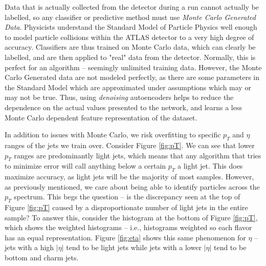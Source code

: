 Data that is actually collected from the detector during a run cannot actually be labelled, so any classifier or predictive method must use \emph{Monte Carlo Generated Data}. Physicists understand the Standard Model of Particle Physics well enough to model particle collisions within the ATLAS detector to a very high degree of accuracy. Classifiers are thus trained on Monte Carlo data, which can clearly be labelled, and are then applied to "real" data from the detector. Normally, this is perfect for an algorithm -- seemingly unlimited training data. However, the Monte Carlo Generated data are not modeled perfectly, as there are some parameters in the Standard Model which are approximated under assumptions which may or may not be true. Thus, using \emph{denoising} autoencoders helps to reduce the dependence on the actual values presented to the network, and learns a less Monte Carlo dependent feature representation of the dataset.

In addition to issues with Monte Carlo, we risk overfitting to specific $p_T$ and $\eta$ ranges of the jets we train over. Consider Figure \ref{fig:pT}. We can see that lower $p_T$ ranges are predominantly light jets, which means that any algorithm that tries to minimize error will call anything below a certain $p_T$ a light jet. This does maximize accuracy, as light jets will be the majority of most samples. However, as previously mentioned, we care about being able to identify particles across the $p_T$ spectrum. This begs the question -- is the discrepancy seen at the top of Figure \ref{fig:pT} caused by a disproportionate number of light jets in the entire sample? To answer this, consider the histogram at the bottom of Figure \ref{fig:pT}, which shows the weighted histograms -- i.e., histograms weighted so each flavor has an equal representation. Figure \ref{fig:eta} shows this same phenomenon for $\eta$ -- jets with a high $\vert\eta\vert$ tend to be light jets while jets with a lower $\vert\eta\vert$ tend to be bottom and charm jets. 


